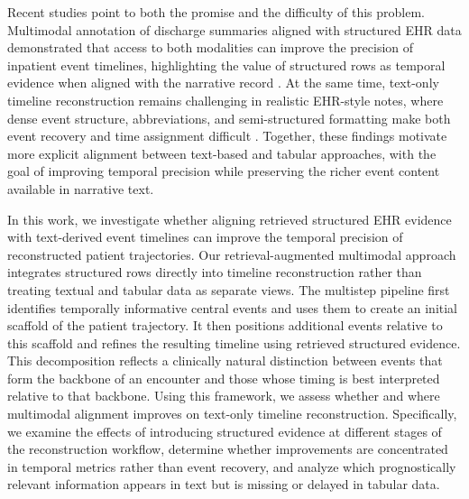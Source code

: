 Recent studies point to both the promise and the difficulty of this problem.
Multimodal annotation of discharge summaries aligned with structured EHR data demonstrated that access to both modalities can improve the precision of inpatient event timelines, highlighting the value of structured rows as temporal evidence when aligned with the narrative record \cite{ch08:frattallone2024using}.
At the same time, text-only timeline reconstruction remains challenging in realistic EHR-style notes, where dense event structure, abbreviations, and semi-structured formatting make both event recovery and time assignment difficult \cite{noroozizadeh2026reconstructing,ch08:noroozizadeh2026forecasting}.
Together, these findings motivate more explicit alignment between text-based and tabular approaches, with the goal of improving temporal precision while preserving the richer event content available in narrative text.\cite{ch08:moldwin2021empirical,seinen2025using}

In this work, we investigate whether aligning retrieved structured EHR evidence with text-derived event timelines can improve the temporal precision of reconstructed patient trajectories.
Our retrieval-augmented multimodal approach integrates structured rows directly into timeline reconstruction rather than treating textual and tabular data as separate views.
The multistep pipeline first identifies temporally informative central events and uses them to create an initial scaffold of the patient trajectory.
It then positions additional events relative to this scaffold and refines the resulting timeline using retrieved structured evidence.
This decomposition reflects a clinically natural distinction between events that form the backbone of an encounter and those whose timing is best interpreted relative to that backbone.
Using this framework, we assess whether and where multimodal alignment improves on text-only timeline reconstruction.
Specifically, we examine the effects of introducing structured evidence at different stages of the reconstruction workflow, determine whether improvements are concentrated in temporal metrics rather than event recovery, and analyze which prognostically relevant information appears in text but is missing or delayed in tabular data.








